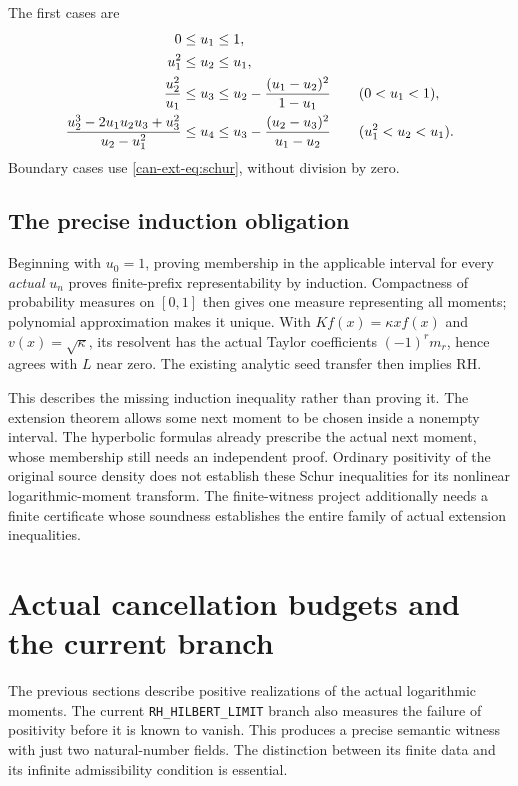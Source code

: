 \documentclass[11pt,a4paper]{article}
\numberwithin{equation}{section}
\theoremstyle{definition}
\theoremstyle{remark}
\begin{document}
The first cases are
\begin{align}
 0&\leq u_1\leq1,\notag\\
 u_1^2&\leq u_2\leq u_1,\notag\\
 \frac{u_2^2}{u_1}&\leq u_3\leq
 u_2-\frac{(u_1-u_2)^2}{1-u_1}\qquad(0<u_1<1),
 \label{can-ext-eq:first-intervals}\\
 \frac{u_2^3-2u_1u_2u_3+u_3^2}{u_2-u_1^2}
 &\leq u_4\leq
 u_3-\frac{(u_2-u_3)^2}{u_1-u_2}\qquad(u_1^2<u_2<u_1).
 \notag
\end{align}
Boundary cases use \eqref{can-ext-eq:schur}, without division by zero.

\subsection{The precise induction obligation}

Beginning with $u_0=1$, proving membership in the applicable interval
for every \emph{actual} $u_n$ proves finite-prefix representability
by induction. Compactness of probability measures on $[0,1]$ then
gives one measure representing all moments; polynomial approximation
makes it unique. With $Kf(x)=\kappa xf(x)$ and
$v(x)=\sqrt\kappa$, its resolvent has the actual Taylor coefficients
$(-1)^rm_r$, hence agrees with $L$ near zero. The existing analytic
seed transfer then implies RH.

This describes the missing induction inequality rather than proving it.
The extension theorem allows some next moment to be chosen inside a
nonempty interval. The hyperbolic formulas already prescribe the actual
next moment, whose membership still needs an independent proof.
Ordinary positivity of the original source density does not establish
these Schur inequalities for its nonlinear logarithmic-moment transform.
The finite-witness project additionally needs a finite certificate whose
soundness establishes the entire family of actual extension inequalities.



\section[Cancellation budgets]{Actual cancellation budgets and the current branch}
\label{sec:cancellation}

The previous sections describe positive realizations of the actual
logarithmic moments. The current \texttt{RH\_HILBERT\_LIMIT} branch also
measures the failure of positivity before it is known to vanish. This
produces a precise semantic witness with just two natural-number fields.
The distinction between its finite data and its infinite admissibility
condition is essential.
\end{document}
